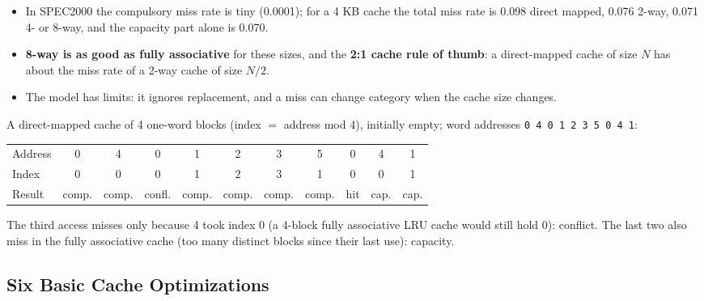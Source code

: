 \begin{itemize}
  \item In SPEC2000 the compulsory miss rate is tiny (0.0001); for a 4 KB cache the
  total miss rate is 0.098 direct mapped, 0.076 2-way, 0.071 4- or 8-way, and the
  capacity part alone is 0.070.
  \item \textbf{8-way is as good as fully associative} for these sizes, and the
  \textbf{2:1 cache rule of thumb}: a direct-mapped cache of size $N$ has about the
  miss rate of a 2-way cache of size $N/2$.
  \item The model has limits: it ignores replacement, and a miss can change
  category when the cache size changes.
\end{itemize}

\begin{eg}
A direct-mapped cache of 4 one-word blocks (index $=$ address mod 4), initially
empty; word addresses \texttt{0 4 0 1 2 3 5 0 4 1}:
\begin{center}
\small
\begin{tabular}{@{}lcccccccccc@{}}
\toprule
Address & 0 & 4 & 0 & 1 & 2 & 3 & 5 & 0 & 4 & 1 \\
Index & 0 & 0 & 0 & 1 & 2 & 3 & 1 & 0 & 0 & 1 \\
Result & comp. & comp. & confl. & comp. & comp. & comp. & comp. & hit & cap. & cap. \\
\bottomrule
\end{tabular}
\end{center}
The third access misses only because 4 took index 0 (a 4-block fully associative
LRU cache would still hold 0): conflict. The last two also miss in the fully
associative cache (too many distinct blocks since their last use): capacity.
\end{eg}

\subsection{Six Basic Cache Optimizations}
\label{sec:basic-opt}

